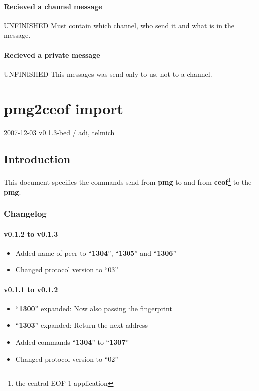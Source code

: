 \documentclass[12pt,a4paper]{book}
\begin{document}
\subsubsection{Recieved a channel message}
UNFINISHED
Must contain which channel, who send it and what is in the message.
\subsubsection{Recieved a private message}
UNFINISHED
This messages was send only to us, not to a channel.
\chapter{pmg2ceof import}

2007-12-03 v0.1.3-bed / adi, telmich

\section{Introduction}
This document specifies the commands send from \textbf{pmg} to and from
\textbf{ceof}\footnote{the central EOF-1 application} to the \textbf{pmg}.

\subsection{Changelog}
\subsubsection{v0.1.2 to v0.1.3}
\begin{itemize}
\item Added name of peer to "`\textbf{1304}"', "`\textbf{1305}"' and "`\textbf{1306}"'
\item Changed protocol version to "`03"'
\end{itemize}
\subsubsection{v0.1.1 to v0.1.2}
\begin{itemize}
\item "`\textbf{1300}"' expanded: Now also passing the fingerprint
\item "`\textbf{1303}"' expanded: Return the next address
\item Added commands "`\textbf{1304}"' to "`\textbf{1307}"'
\item Changed protocol version to "`02"'
\end{itemize}
\end{document}
